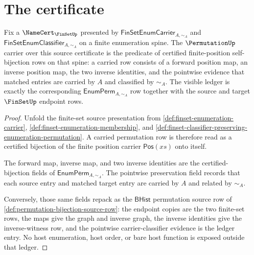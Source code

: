 \section{The certificate}
\label{sec:permutation-certificate}

\begin{theorem}
\label{thm:permutation-finset-carrier-obligation}
Fix a $\NameCert_{\FinSetUp}$ presented by $\mathsf{FinSetEnumCarrier}_{A,\sim_A}$ and $\mathsf{FinSetEnumClassifier}_{A,\sim_A}$ on a finite enumeration spine. The $\PermutationUp$ carrier over this source certificate is the predicate of certified finite-position self-bijection rows on that spine: a carried row consists of a forward position map, an inverse position map, the two inverse identities, and the pointwise evidence that matched entries are carried by $A$ and classified by $\sim_A$. The visible ledger is exactly the corresponding $\mathsf{EnumPerm}_{A,\sim_A}$ row together with the source and target $\FinSetUp$ endpoint rows.
\end{theorem}
\begin{proof}
Unfold the finite-set source presentation from \autoref{def:finset-enumeration-carrier}, \autoref{def:finset-enumeration-membership}, and \autoref{def:finset-classifier-preserving-enumeration-permutation}. A carried permutation row is therefore read as a certified bijection of the finite position carrier $\mathsf{Pos}(xs)$ onto itself.

The forward map, inverse map, and two inverse identities are the certified-bijection fields of $\mathsf{EnumPerm}_{A,\sim_A}$. The pointwise preservation field records that each source entry and matched target entry are carried by $A$ and related by $\sim_A$.

Conversely, those same fields repack as the $\mathsf{BHist}$ permutation source row of \autoref{def:permutation-bijection-source-row}: the endpoint copies are the two finite-set rows, the maps give the graph and inverse graph, the inverse identities give the inverse-witness row, and the pointwise carrier-classifier evidence is the ledger entry. No host enumeration, host order, or bare host function is exposed outside that ledger.
\end{proof}

